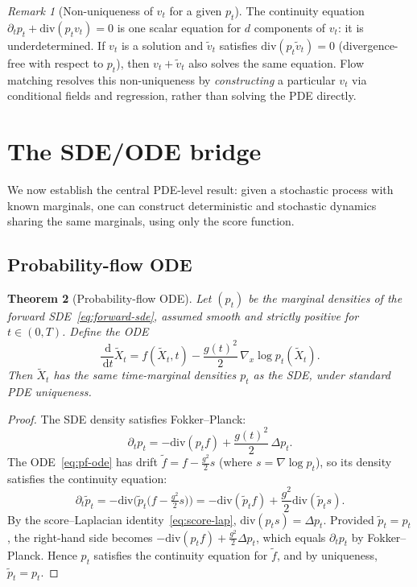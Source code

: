 \documentclass[11pt]{article}
\newcommand{\grad}{\nabla}
\newcommand{\diver}{\mathrm{div}}
\newcommand{\dd}{\,\mathrm{d}}
\newtheorem{theorem}{Theorem}[section]
\theoremstyle{definition}
\theoremstyle{remark}
\newtheorem{remark}[theorem]{Remark}
\begin{document}
\begin{remark}[Non-uniqueness of $v_t$ for a given $p_t$]
The continuity equation $\partial_t p_t + \diver(p_t v_t) = 0$ is one scalar equation for $d$ components of $v_t$: it is underdetermined.
If $v_t$ is a solution and $\tilde{v}_t$ satisfies $\diver(p_t \tilde{v}_t)=0$ (divergence-free with respect to $p_t$), then $v_t + \tilde{v}_t$ also solves the same equation.
Flow matching resolves this non-uniqueness by \emph{constructing} a particular $v_t$ via conditional fields and regression, rather than solving the PDE directly.
\end{remark}

\section{The SDE/ODE bridge}\label{sec:sde-ode-bridge}

We now establish the central PDE-level result: given a stochastic process with known marginals, one can construct deterministic and stochastic dynamics sharing the same marginals, using only the score function.

\subsection{Probability-flow ODE}\label{subsec:pf-ode}

\begin{theorem}[Probability-flow ODE]\label{thm:pf-ode}
Let $(p_t)$ be the marginal densities of the forward SDE~\eqref{eq:forward-sde}, assumed smooth and strictly positive for $t\in(0,T)$.
Define the ODE
\begin{equation}\label{eq:pf-ode}
\frac{\dd}{\dd t}\tilde{X}_t = f(\tilde{X}_t,t) - \frac{g(t)^2}{2}\,\grad_x\log p_t(\tilde{X}_t).
\end{equation}
Then $\tilde{X}_t$ has the same time-marginal densities $p_t$ as the SDE, under standard PDE uniqueness.
\end{theorem}

\begin{proof}
The SDE density satisfies Fokker--Planck:
\[
\partial_t p_t = -\diver(p_t f) + \frac{g(t)^2}{2}\,\Delta p_t.
\]
The ODE~\eqref{eq:pf-ode} has drift $\tilde{f} = f - \frac{g^2}{2}s$ (where $s = \grad\log p_t$), so its density satisfies the continuity equation:
\[
\partial_t \tilde{p}_t = -\diver\!\Big(\tilde{p}_t\big(f - \tfrac{g^2}{2}s\big)\Big) = -\diver(\tilde{p}_t f) + \frac{g^2}{2}\diver(\tilde{p}_t s).
\]
By the score--Laplacian identity~\eqref{eq:score-lap}, $\diver(p_t s) = \Delta p_t$.
Provided $\tilde{p}_t = p_t$, the right-hand side becomes $-\diver(p_t f) + \frac{g^2}{2}\Delta p_t$, which equals $\partial_t p_t$ by Fokker--Planck.
Hence $p_t$ satisfies the continuity equation for $\tilde{f}$, and by uniqueness, $\tilde{p}_t = p_t$.
\end{proof}
\end{document}
